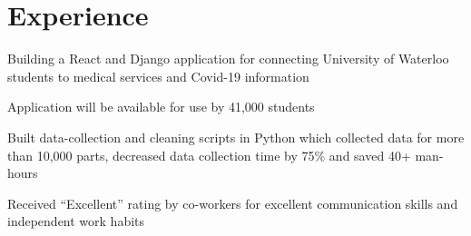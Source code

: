 \documentclass[]{deedy-resume-openfont}
\begin{document}
\begin{minipage}[t]{0.66\textwidth} 


\section{Experience}
\vspace{3mm} %
\begin{tightemize}
\item Building a React and Django application for  connecting University of Waterloo students  to medical services and Covid-19 information 
\item Application will be available for use by 41,000 students
\end{tightemize}
\sectionsep

\vspace{1mm} %
\begin{tightemize}
\item Built data-collection and cleaning scripts in Python which collected data for more than 10,000 parts, decreased data collection time by 75\% and  saved 40+ man-hours
\item Received “Excellent” rating by co-workers for excellent communication skills and independent work habits
\end{tightemize}
\sectionsep



\end{minipage}
\end{document}

